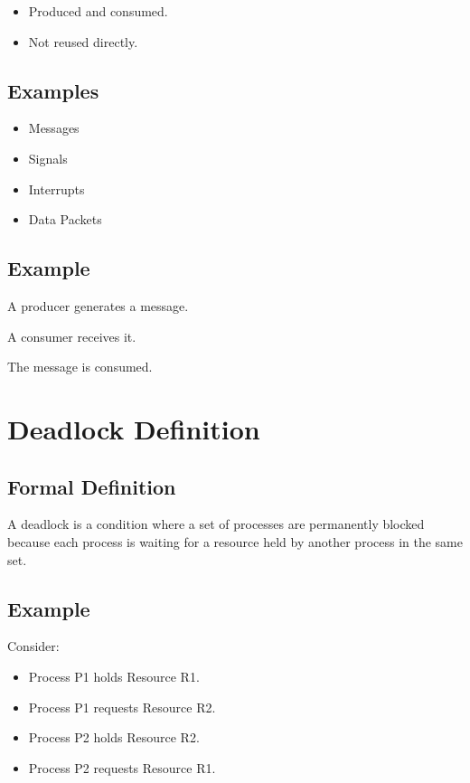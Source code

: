 \begin{itemize}
\item Produced and consumed.
\item Not reused directly.
\end{itemize}

\subsection{Examples}

\begin{itemize}
\item Messages
\item Signals
\item Interrupts
\item Data Packets
\end{itemize}

\subsection{Example}

A producer generates a message.

A consumer receives it.

The message is consumed.

\section{Deadlock Definition}

\subsection{Formal Definition}

A deadlock is a condition where a set of processes are permanently blocked because each process is waiting for a resource held by another process in the same set.

\subsection{Example}

Consider:

\begin{itemize}
\item Process P1 holds Resource R1.
\item Process P1 requests Resource R2.
\item Process P2 holds Resource R2.
\item Process P2 requests Resource R1.
\end{itemize}


